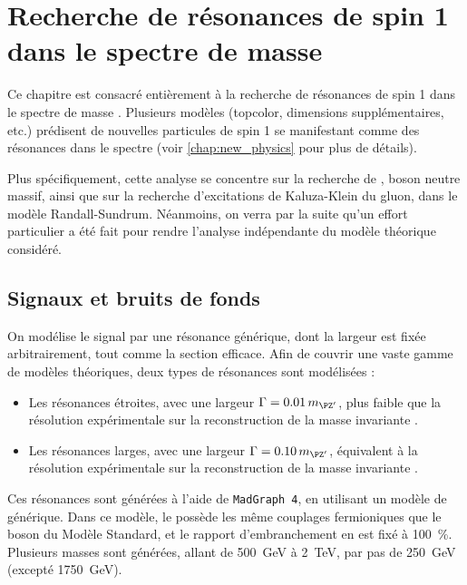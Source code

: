 \chapter{Recherche de résonances de spin 1 dans le spectre de masse \ttbar} \label{chap:zprime}

Ce chapitre est consacré entièrement à la recherche de résonances de spin 1 dans le spectre de masse \ttbar. Plusieurs modèles (topcolor, dimensions supplémentaires, etc.) prédisent de nouvelles particules de spin 1 se manifestant comme des résonances dans le spectre \mtt (voir \cref{chap:new_physics} pour plus de détails).

\bigskip

Plus spécifiquement, cette analyse se concentre sur la recherche de \zprime, boson neutre massif, ainsi que sur la recherche d'excitations de Kaluza-Klein du gluon, dans le modèle Randall-Sundrum. Néanmoins, on verra par la suite qu'un effort particulier a été fait pour rendre l'analyse indépendante du modèle théorique considéré.

\section{Signaux et bruits de fonds}

On modélise le signal par une résonance générique, dont la largeur est fixée arbitrairement, tout comme la section efficace. Afin de couvrir une vaste gamme de modèles théoriques, deux types de résonances sont modélisées :
\begin{itemize}
    \item Les résonances étroites, avec une largeur $\Gamma = \num{0.01} \, \mzp$, plus faible que la résolution expérimentale sur la reconstruction de la masse invariante \ttbar.
    \item Les résonances larges, avec une largeur $\Gamma = \num{0.10} \, \mzp$, équivalent à la résolution expérimentale sur la reconstruction de la masse invariante \ttbar.
\end{itemize}

Ces résonances sont générées à l'aide de \texttt{MadGraph 4}, en utilisant un modèle de \zprime générique. Dans ce modèle, le \zprime possède les même couplages fermioniques que le boson \PZ du Modèle Standard, et le rapport d'embranchement en \ttbar est fixé à \SI{100}{\%}. Plusieurs masses sont générées, allant de \SI{500}{\GeV} à \SI{2}{\TeV}, par pas de \SI{250}{\GeV} (excepté \SI{1750}{\GeV}). 

\smallskip

